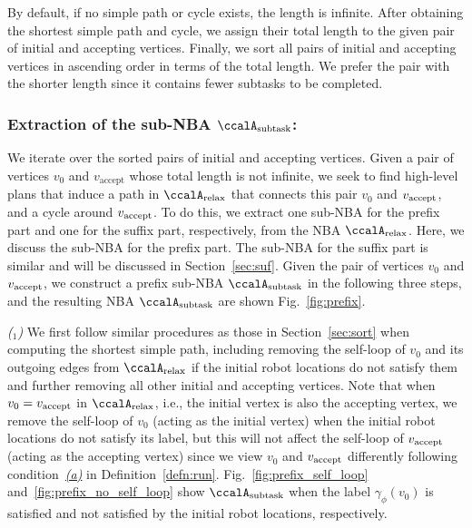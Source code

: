 \documentclass[Afour,sageh,times]{sagej}
\newcounter{mycounter}
\newcommand{\auto}[1]{\ccalA_{\textup{#1}}}
\newcommand{\vertex}[1]{v_{\textup{#1}}}
\begin{document}
{  By default, if no simple path or cycle exists, the length is infinite. After obtaining the shortest simple path and cycle, we assign their total length to the given pair of initial and accepting vertices.  Finally,  we sort all pairs of initial and accepting vertices in ascending order in terms of the total length. We prefer the pair with the shorter length since it contains fewer subtasks to be completed.}


  \subsubsection{Extraction of the sub-NBA \upshape $\auto{subtask}$:}\label{sub-NBA:1}
  We iterate over the sorted pairs of initial and accepting vertices. Given a pair of vertices  $v_0$ and $v_\text{accept}$ whose total length is not infinite, we seek to find  high-level plans that induce a path in $\auto{relax}$ that connects this pair $v_0$ and $\vertex{accept}$, and a cycle around $\vertex{accept}$. To do this,  we extract one sub-NBA for the prefix part and one for the suffix part, respectively, from the NBA $\auto{relax}$.  Here, we discuss the sub-NBA for the prefix part. The  sub-NBA for the suffix part is similar and will be  discussed in Section~\ref{sec:suf}.  Given the pair of vertices $v_0$ and $\vertex{accept}$, we construct a prefix sub-NBA $\auto{subtask}$ in the following three steps, and the resulting NBA $\auto{subtask}$ are shown Fig.~\ref{fig:prefix}.

   {\it ($_1$)} We first follow similar procedures as those in Section~\ref{sec:sort} when computing the shortest simple path, including removing the self-loop of $v_0$ and its outgoing edges from $\auto{relax}$ if the initial robot locations do not satisfy them and further removing all other initial and accepting vertices.  Note that when $v_0 = \vertex{accept}$ in $\auto{relax}$, i.e., the initial vertex is also the accepting vertex, we remove the self-loop of $v_0$ (acting as the initial vertex) when the initial robot locations do not satisfy its label, but this will not affect the self-loop of $\vertex{accept}$ (acting as the accepting vertex) since  we view $v_0$ and $\vertex{accept}$ differently following condition~\hyperref[cond:a]{\it (a)} in Definition~\ref{defn:run}. Fig.~\ref{fig:prefix_self_loop}  and~\ref{fig:prefix_no_self_loop} show   $\auto{subtask}$  when the label $\gamma_{\phi}(v_0)$ is satisfied and not satisfied  by the initial robot locations, respectively.
\end{document}
